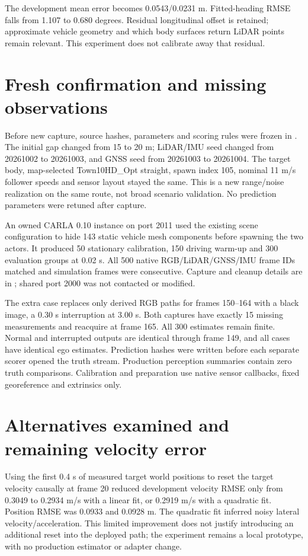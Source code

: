 \documentclass[11pt]{article}
\begin{document}
The development mean error becomes 0.0543/0.0231 m. Fitted-heading RMSE
falls from 1.107 to 0.680 degrees. Residual longitudinal offset is retained;
approximate vehicle geometry and which body surfaces return LiDAR points
remain relevant. This experiment does not calibrate away that residual.

\section{Fresh confirmation and missing observations}
Before new capture, source hashes, parameters and scoring rules were frozen in
. The initial gap changed from 15 to 20 m;
LiDAR/IMU seed changed from 20261002 to 20261003, and GNSS seed from
20261003 to 20261004. The target body, map-selected Town10HD\_Opt straight,
spawn index 105, nominal 11 m/s follower speeds and sensor layout stayed the
same. This is a new range/noise realization on the same route, not broad
scenario validation. No prediction parameters were retuned after capture.

An owned CARLA 0.10 instance on port 2011 used the existing scene configuration
to hide 143 static vehicle mesh components before spawning the two actors.
It produced 50 stationary calibration, 150 driving warm-up and 300 evaluation
groups at 0.02 s. All 500 native RGB/LiDAR/GNSS/IMU frame IDs matched and
simulation frames were consecutive. Capture and cleanup details are in
; shared port 2000 was not contacted or modified.

The extra case replaces only derived RGB paths for frames 150--164 with a
black image, a 0.30 s interruption at 3.00 s. Both captures have exactly 15
missing measurements and reacquire at frame 165. All 300 estimates remain
finite. Normal and interrupted outputs are identical through frame 149,
and all cases have identical ego estimates. Prediction hashes were written
before each separate scorer opened the truth stream. Production perception
summaries contain zero truth comparisons. Calibration and preparation use
native sensor callbacks, fixed georeference and extrinsics only.

\section{Alternatives examined and remaining velocity error}
Using the first 0.4 s of measured target world positions to reset the target
velocity causally at frame 20 reduced development velocity RMSE only from
0.3049 to 0.2934 m/s with a linear fit, or 0.2919 m/s with a quadratic fit.
Position RMSE was 0.0933 and 0.0928 m. The quadratic fit inferred noisy lateral
velocity/acceleration. This limited improvement does not justify introducing
an additional reset into the deployed path; the experiment remains a local
prototype, with no production estimator or adapter change.
\end{document}
